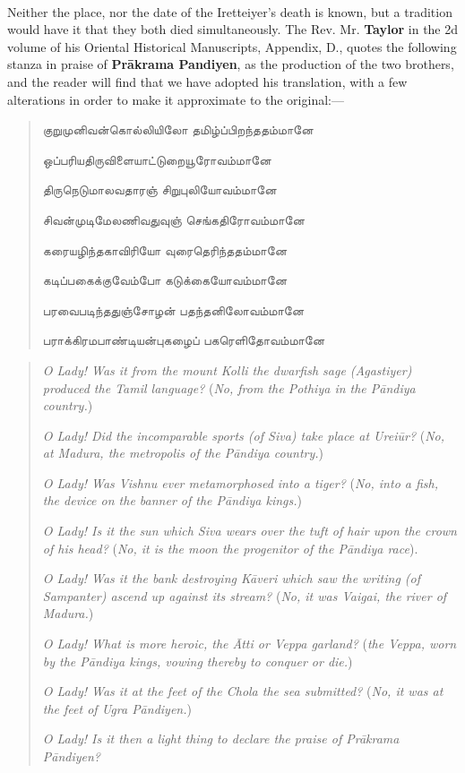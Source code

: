 \documentclass{article}
\newcommand{\TamilText}[1]{\texttamil{#1}}
\newcommand{\tam}[1]{\TamilText{#1}}
\begin{document}
\paragraph{}
Neither the place, nor the date of the Iretteiyer's death is known, but a tradition would have it that they both died simultaneously. The Rev. Mr. \textbf{Taylor} in the 2d volume of his Oriental Historical Manuscripts, Appendix, D., quotes the following stanza in praise of \textbf{Pr\={a}krama Pandiyen}, as the production of the two brothers, and the reader will find that we have adopted his translation, with a few alterations in order to make it approximate to the original:---
\begin{quotation}\small
\tam{குறுமுனிவன்கொல்லியிலோ தமிழ்ப்பிறந்ததம்மானே}

\tam{ஒப்பரியதிருவிளையாட்டுறையூரோவம்மானே}

\tam{திருநெடுமாலவதாரஞ்‌ சிறுபுலியோவம்மானே}

\tam{சிவன்முடிமேலணிவதுவுஞ்‌ செங்கதிரோவம்மானே}

\tam{கரையழிந்தகாவிரியோ வுரைதெரிந்ததம்மானே}

\tam{கடிப்பகைக்குவேம்போ கடுக்கையோவம்மானே}

\tam{பரவைபடிந்ததுஞ்சோழன்‌ பதந்தனிலோவம்மானே}

\tam{பராக்கிரமபாண்டியன்புகழைப்‌ பகரெளிதோவம்மானே}
\end{quotation}
\begin{quotation}\small
\emph{O Lady! Was it from the mount Kolli the dwarfish sage (Agastiyer) produced the Tamil language?} (\emph{No, from the Pothiya in the P\={a}ndiya country.})

\emph{O Lady! Did the incomparable sports (of Siva) take place at Urei\={u}r?} (\emph{No, at Madura, the metropolis of the P\={a}ndiya country.}) 

\emph{O Lady! Was Vishnu ever metamorphosed into a tiger?} (\emph{No, into a fish, the device on the banner of the P\={a}ndiya kings.})

\emph{O Lady! Is it the sun which Siva wears over the tuft of hair upon the crown of his head?} (\emph{No, it is the moon the progenitor of the P\={a}ndiya race}).

\emph{O Lady! Was it the bank destroying K\={a}veri which saw the writing (of Sampanter) ascend up against its stream?} (\emph{No, it was Vaigai, the river of Madura.})

\emph{O Lady! What is more heroic, the \={A}tti or Veppa garland?} (\emph{the Veppa, worn by the P\={a}ndiya kings, vowing thereby to conquer or die.})

\emph{O Lady! Was it at the feet of the Chola the sea submitted?} (\emph{No, it was at the feet of Ugra P\={a}ndiyen.})

\emph{O Lady! Is it then a light thing to declare the praise of Pr\={a}krama P\={a}ndiyen?}
\end{quotation}
\end{document}
